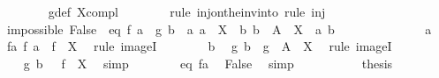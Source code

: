 \begin{isabellebody}
\ \ \ \ \ \ \isamarkupfalse%
\ g{\isacharprime}{\kern0pt}{\isacharunderscore}{\kern0pt}def\ X{\isacharunderscore}{\kern0pt}compl\isanewline
\ \ \ \ \ \ \isamarkupfalse%
\ {\isacharparenleft}{\kern0pt}rule\ inj{\isacharunderscore}{\kern0pt}on{\isacharunderscore}{\kern0pt}the{\isacharunderscore}{\kern0pt}inv{\isacharunderscore}{\kern0pt}into{\isacharparenright}{\kern0pt}\ {\isacharparenleft}{\kern0pt}rule\ inj{}{\isacharprime}{\kern0pt}{\isacharparenright}{\kern0pt}\isanewline
\isanewline
\ \ \ \ \isamarkupfalse%
\ impossible{\isacharcolon}{\kern0pt}\ False\ \ eq{\isacharcolon}{\kern0pt}\ {\isachardoublequoteopen}f\ a\ {\isacharequal}{\kern0pt}\ g{\isacharprime}{\kern0pt}\ b{\isachardoublequoteclose}\ \ a{\isacharcolon}{\kern0pt}\ {\isachardoublequoteopen}a\ {\isasymin}\ X{\isachardoublequoteclose}\ \ b{\isacharcolon}{\kern0pt}\ {\isachardoublequoteopen}b\ {\isasymin}\ A\ {\isacharminus}{\kern0pt}\ X{\isachardoublequoteclose}\ \ a\ b\isanewline
\ \ \ \ \isamarkupfalse%
\ {\isacharminus}{\kern0pt}\isanewline
\ \ \ \ \ \ \isamarkupfalse%
\ a\ \isamarkupfalse%
\ fa{\isacharcolon}{\kern0pt}\ {\isachardoublequoteopen}f\ a\ {\isasymin}\ f\ {\isacharbackquote}{\kern0pt}\ X{\isachardoublequoteclose}\ \isamarkupfalse%
\ {\isacharparenleft}{\kern0pt}rule\ imageI{\isacharparenright}{\kern0pt}\isanewline
\ \ \ \ \ \ \isamarkupfalse%
\ b\ \isamarkupfalse%
\ {\isachardoublequoteopen}g{\isacharprime}{\kern0pt}\ b\ {\isasymin}\ g{\isacharprime}{\kern0pt}\ {\isacharbackquote}{\kern0pt}\ {\isacharparenleft}{\kern0pt}A\ {\isacharminus}{\kern0pt}\ X{\isacharparenright}{\kern0pt}{\isachardoublequoteclose}\ \isamarkupfalse%
\ {\isacharparenleft}{\kern0pt}rule\ imageI{\isacharparenright}{\kern0pt}\isanewline
\ \ \ \ \ \ \isamarkupfalse%
\ {\isacharasterisk}{\kern0pt}\ \isamarkupfalse%
\ {\isachardoublequoteopen}g{\isacharprime}{\kern0pt}\ b\ {\isasymin}\ {\isacharminus}{\kern0pt}\ {\isacharparenleft}{\kern0pt}f\ {\isacharbackquote}{\kern0pt}\ X{\isacharparenright}{\kern0pt}{\isachardoublequoteclose}\ \isamarkupfalse%
\ simp\isanewline
\ \ \ \ \ \ \isamarkupfalse%
\ eq\ fa\ \isamarkupfalse%
\ False\ \isamarkupfalse%
\ simp\isanewline
\ \ \ \ \isamarkupfalse%
\isanewline
\isanewline
\ \ \ \ \isamarkupfalse%
\ {\isacharquery}{\kern0pt}thesis\isanewline

\end{isabellebody}
